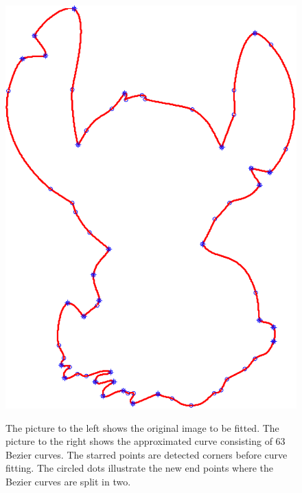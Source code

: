 \documentclass[10pt]{article}
\begin{document}
\begin{figure}
\begin{minipage}[t]{.5\textwidth}
    \includegraphics[scale=0.45]{figure5-crop.pdf}
    \label{fig:cornerdet}
\end{minipage}\hfill
\caption{The picture to the left shows the original image to be fitted. The picture to the right shows the approximated curve consisting of 63 Bezier curves. The starred points are detected corners before curve fitting. The circled dots illustrate the new end points where the Bezier curves are split in two.}
\label{fig:stitch}
\end{figure}
\end{document}
